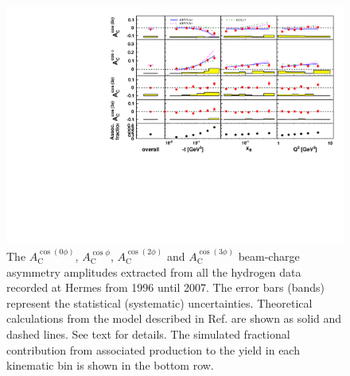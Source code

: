 \begin{figure}
  \begin{center}
    \includegraphics[width=15cm]{macros/morgan_change2}
    \caption{The $A_{\textrm{C}}^{\cos(0\phi)}$, $A_{\textrm{C}}^{\cos\phi}$, $A_{\textrm{C}}^{\cos(2\phi)}$ and $A_{\textrm{C}}^{\cos(3\phi)}$ beam-charge asymmetry amplitudes extracted from all the hydrogen data recorded at H{\sc ermes} from 1996 until 2007. The error bars (bands) represent the statistical (systematic) uncertainties.  Theoretical calculations from the model described in Ref. \cite{Kum09} are shown as solid and dashed lines. See text for details. The simulated fractional contribution from associated production to the yield in each kinematic bin is shown in the bottom row.}
  \label{bca_xbjrange}
 \end{center}
\end{figure}

